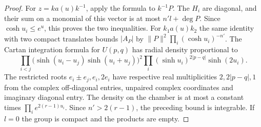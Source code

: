 \documentclass[a4paper,11pt]{article}
\theoremstyle{definition}
\theoremstyle{remark}
\numberwithin{equation}{section}
\begin{document}
\begin{proof}
For \(z=k a(u)k^{-1}\), apply the formula to \(k^{-1}P\).
The \(H_i\) are diagonal, and their sum on a monomial of
this vector is at most \(n'l+\deg P\). Since
\(\cosh u_i\le e^u\), this proves the two inequalities.
For \(k_1a(u)k_2\) the same identity with two compact
translates bounds \(|A_P|\) by
\(\|P\|^2\prod_i(\cosh u_i)^{-n'}\). The Cartan integration
formula for \(U(p,q)\) has radial density proportional to
\[
 \prod_{i<j}\bigl(\sinh(u_i-u_j)\sinh(u_i+u_j)\bigr)^2
          \prod_i(\sinh u_i)^{2|p-q|}\sinh(2u_i).
\]
The restricted roots \(e_i\pm e_j,e_i,2e_i\) have respective
real multiplicities \(2,2|p-q|,1\) from the complex
off-diagonal entries, unpaired complex coordinates and
imaginary diagonal entry. The density on the chamber is at
most a constant times \(\prod_i e^{2(r-1)u_i}\). Since
\(n'>2(r-1)\), the preceding bound is integrable.
If \(l=0\) the group is compact and the products are empty.
\end{proof}
\end{document}
